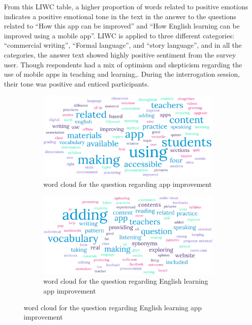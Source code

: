 \documentclass[sn-mathphys,Numbered]{sn-jnl}%
\theoremstyle{thmstyleone}%
\theoremstyle{thmstyletwo}%
\theoremstyle{thmstylethree}%
\begin{document}
From this LIWC table, a higher proportion of words related to positive emotions indicates a positive emotional tone in the text in the answer to the questions related to ``How this app can be improved'' and ``How English learning can be improved using a mobile app''. LIWC is applied to three different categories: ``commercial writing'', ``Formal language'', and ``story language'', and in all the categories, the answer text showed highly positive sentiment from the survey user. Though respondents had a mix of optimism and skepticism regarding the use of mobile apps in teaching and learning,. During the interrogation session, their tone was positive and enticed participants.


\begin{figure}[h!]
\centering
\begin{subfigure}{0.48\textwidth}
    \includegraphics[width=\textwidth]{app_impv.png}
    \caption{word cloud for the question regarding app improvement}
    \label{word_cloud_1}
\end{subfigure}
\hfill
\begin{subfigure}{0.48\textwidth}
    \includegraphics[width=\textwidth]{eng_app_impv.png}
    \caption{word cloud for the question regarding English learning app improvement}
    \label{word_cloud_2}
\end{subfigure}       
\end{figure}
\end{document}
